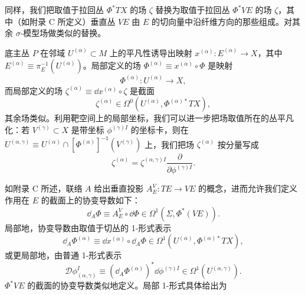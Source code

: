 同样，我们把取值于拉回丛 $\Phi^*TX$ 的场 $\zeta$ 替换为取值于拉回丛 $\Phi^*VE$ 的场 $\zeta$，其中（如附录 C 所定义）垂直丛 $VE$ 由 $E$ 的切向量中沿纤维方向的那些组成。对其余 $\sigma$-模型场做类似的替换。

底主丛 $P$ 在邻域 $U^{(\alpha)}\subset M$ 上的平凡性诱导出映射 $x^{(\alpha)}:E^{(\alpha)}\to X$，其中 $E^{(\alpha)}\equiv\pi_E^{-1}(U^{(\alpha)})$。局部定义的场 $\Phi^{(\alpha)}\equiv x^{(\alpha)}\circ\Phi$ 是映射
\[
  \Phi^{(\alpha)}:U^{(\alpha)}\to X,
\]
而局部定义的场 $\zeta^{(\alpha)}\equiv\dd x^{(\alpha)}\circ\zeta$ 是截面
\[
  \zeta^{(\alpha)}\in\Omega^0\left(U^{(\alpha)},\Phi^{(\alpha)*}TX\right),
\]
其余场类似。利用靶空间上的局部坐标，我们可以进一步把场取值所在的丛平凡化：若 $V^{(\gamma)}\subset X$ 是带坐标 $\phi^{(\gamma)I}$ 的坐标卡，则在 $U^{(\alpha,\gamma)}\equiv U^{(\alpha)}\cap[\Phi^{(\alpha)}]^{-1}(V^{(\gamma)})$ 上，我们把场 $\zeta^{(\alpha)}$ 按分量写成
\[
  \zeta^{(\alpha)}=\zeta^{(\alpha,\gamma)I}\frac{\partial}{\partial\phi^{(\gamma)I}}.
\]

如附录 C 所述，联络 $A$ 给出垂直投影 $A_E^V:TE\to VE$ 的概念，进而允许我们定义作用在 $E$ 的截面上的协变导数如下：
\[
  \dd_A\Phi\equiv A_E^V\circ\dd\Phi\in\Omega^1\left(\Sigma,\Phi^*(VE)\right).
\]
局部地，协变导数由取值于切丛的 1-形式表示
\[
  \dd_A\Phi^{(\alpha)}\equiv\dd x^{(\alpha)}\circ\dd_A\Phi\in\Omega^1\left(U^{(\alpha)},\Phi^{(\alpha)*}TX\right),
\]
或更局部地，由普通 1-形式表示
\[
  \mathcal{D}\phi^I_{(\alpha,\gamma)}\equiv\left(\dd_A\Phi^{(\alpha)}\right)^*\dd\phi^{(\gamma)I}\in\Omega^1\left(U^{(\alpha,\gamma)}\right).
\]
$\Phi^*VE$ 的截面的协变导数类似地定义。局部 1-形式具体给出为


